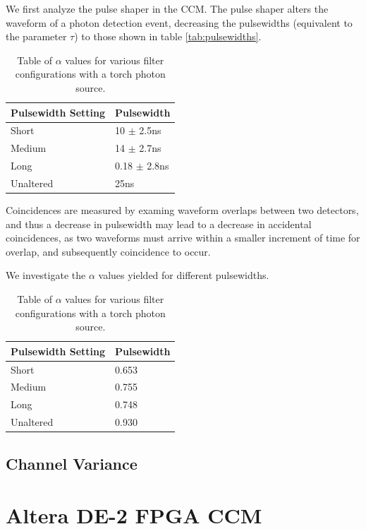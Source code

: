 \documentclass[letterpaper, 11 pt]{book}
\begin{document}
We first analyze the pulse shaper in the CCM. The pulse shaper alters the waveform of a
photon detection event, decreasing the pulsewidths (equivalent to the parameter $\tau$) to those shown in table \ref{tab:pulsewidths}.
\begin{table}[H]
    \centering
    \begin{tabular}{|l|l|}
    \hline
    \textbf{Pulsewidth Setting} & \textbf{Pulsewidth} \\ \hline
    Short        & 10 $\pm$ 2.5ns                   \\ \hline
    Medium        & 14 $\pm$ 2.7ns                   \\ \hline
    Long        & 0.18 $\pm$ 2.8ns                   \\ \hline
    Unaltered                  & 25ns                   \\ \hline
    \end{tabular}
    \caption{Table of $\alpha$ values for various filter configurations with a torch photon source.}
\end{table}\label{tab:pulsewidths}
Coincidences are measured by examing waveform overlaps between two
detectors, and thus a decrease in pulsewidth may lead to a decrease in accidental coincidences,
as two waveforms must arrive within a smaller increment of time for overlap,
and subsequently coincidence to occur.

We investigate the $\alpha$ values yielded for different pulsewidths.
\begin{table}[H]
    \centering
    \begin{tabular}{|l|l|}
    \hline
    \textbf{Pulsewidth Setting} & \textbf{Pulsewidth} \\ \hline
    Short        & 0.653                   \\ \hline
    Medium        & 0.755                   \\ \hline
    Long        & 0.748                   \\ \hline
    Unaltered                  & 0.930                   \\ \hline
    \end{tabular}
    \caption{Table of $\alpha$ values for various filter configurations with a torch photon source.}
\end{table}\label{tab:pulsewidths}
\subsection{Channel Variance}
\section{Altera DE-2 FPGA CCM}

%

\end{document}
